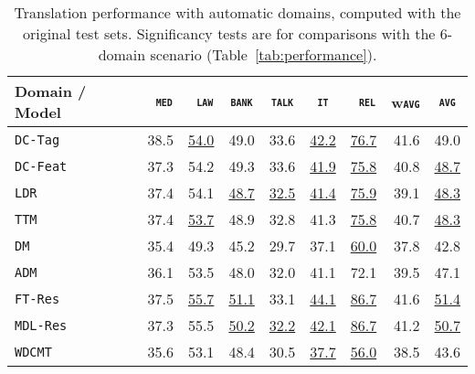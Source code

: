 \documentclass[11pt,a4paper]{article}
\newcommand{\fyDone}[1]{\done[FY]\Todo[FY:]{\textcolor{orange}{#1}}}
\newcommand{\revision}[1]{#1}
\newcommand{\domain}[1]{\texttt{\textsc{#1}}}
\newcommand{\system}[1]{\texttt{{#1}}}
\newcommand{\SB}[1]{\textbf{#1}}
\newcommand{\SW}[1]{\underline{#1}}
\begin{document}
\begin{table*}[t]
  \centering
  \fyDone{Fix column size}
  \begin{tabular}{|p{3cm}|*{8}{r|}} \hline
    Domain / Model  & \multicolumn{1}{c|}{\domain{ med}} & \multicolumn{1}{c|}{\domain{ law}} & \multicolumn{1}{c|}{\domain{bank}} & \multicolumn{1}{c|}{\domain{talk}} & \multicolumn{1}{c|}{\domain{ it }} & \multicolumn{1}{c|}{\domain{ rel}} & \multicolumn{1}{c|}{w\domain{avg}} & \multicolumn{1}{c|}{\domain{avg}} \\ \hline %
    \system{DC-Tag}       & 38.5 & \SW{54.0} & 49.0   & 33.6 & \SW{42.2} & \SW{76.7} & 41.6 & 49.0 \\%
    \system{DC-Feat}      & 37.3  & 54.2 & 49.3   & 33.6 & \SW{41.9} & \SW{75.8} & 40.8 & \SW{48.7}  \\%
    \system{LDR}             & 37.4   & 54.1 & \SW{48.7} & \SW{32.5} & \SW{41.4} & \SW{75.9} & 39.1 & \SW{48.3}         \\%
    \system{TTM}            & 37.4 & \SW{53.7} & 48.9 & 32.8 & 41.3 & \SW{75.8} & 40.7 & \SW{48.3}   \\%
    \system{DM}             & 35.4 & 49.3  & 45.2 & 29.7 & 37.1 & \SW{60.0} & 37.8 & 42.8 \\ %
    \system{ADM}           & 36.1 & 53.5  & 48.0 & 32.0 & 41.1 & 72.1 & 39.5 & 47.1\\%
    \revision{\system{FT-Res}}     & 37.5 & \SW{55.7}  & \SW{51.1}   & 33.1   &  \SW{44.1}  & \SW{86.7} & 41.6 & \SW{51.4}\\%
    \system{MDL-Res}     & 37.3 & 55.5  & \SW{50.2}   & \SW{32.2}   &  \SW{42.1}  & \SW{86.7} & 41.2 & \SW{50.7}\\%
    \system{WDCMT}       & 35.6 & 53.1 & 48.4 & 30.5 & \SW{37.7} & \SW{56.0} & 38.5 & 43.6 \\ %
    \hline
  \end{tabular}
  \caption{Translation performance with automatic domains, computed with the original test sets. Significancy tests are for comparisons with the 6-domain scenario \revision{(Table~\ref{tab:performance}).}}
  \label{tab:subdomains}
  \fyDone{Fill the table with correct results,}\fyDone{Change wavg and avg}
\end{table*}
\end{document}
